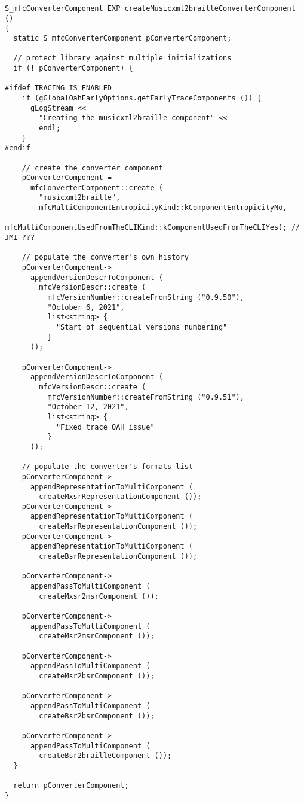 \begin{lstlisting}[language=CPlusPlus]
S_mfcConverterComponent EXP createMusicxml2brailleConverterComponent ()
{
  static S_mfcConverterComponent pConverterComponent;

  // protect library against multiple initializations
  if (! pConverterComponent) {

#ifdef TRACING_IS_ENABLED
    if (gGlobalOahEarlyOptions.getEarlyTraceComponents ()) {
      gLogStream <<
        "Creating the musicxml2braille component" <<
        endl;
    }
#endif

    // create the converter component
    pConverterComponent =
      mfcConverterComponent::create (
        "musicxml2braille",
        mfcMultiComponentEntropicityKind::kComponentEntropicityNo,
        mfcMultiComponentUsedFromTheCLIKind::kComponentUsedFromTheCLIYes); // JMI ???

    // populate the converter's own history
    pConverterComponent->
      appendVersionDescrToComponent (
        mfcVersionDescr::create (
          mfcVersionNumber::createFromString ("0.9.50"),
          "October 6, 2021",
          list<string> {
            "Start of sequential versions numbering"
          }
      ));

    pConverterComponent->
      appendVersionDescrToComponent (
        mfcVersionDescr::create (
          mfcVersionNumber::createFromString ("0.9.51"),
          "October 12, 2021",
          list<string> {
            "Fixed trace OAH issue"
          }
      ));

    // populate the converter's formats list
    pConverterComponent->
      appendRepresentationToMultiComponent (
        createMxsrRepresentationComponent ());
    pConverterComponent->
      appendRepresentationToMultiComponent (
        createMsrRepresentationComponent ());
    pConverterComponent->
      appendRepresentationToMultiComponent (
        createBsrRepresentationComponent ());

    pConverterComponent->
      appendPassToMultiComponent (
        createMxsr2msrComponent ());

    pConverterComponent->
      appendPassToMultiComponent (
        createMsr2msrComponent ());

    pConverterComponent->
      appendPassToMultiComponent (
        createMsr2bsrComponent ());

    pConverterComponent->
      appendPassToMultiComponent (
        createBsr2bsrComponent ());

    pConverterComponent->
      appendPassToMultiComponent (
        createBsr2brailleComponent ());
  }

  return pConverterComponent;
}
\end{lstlisting}


